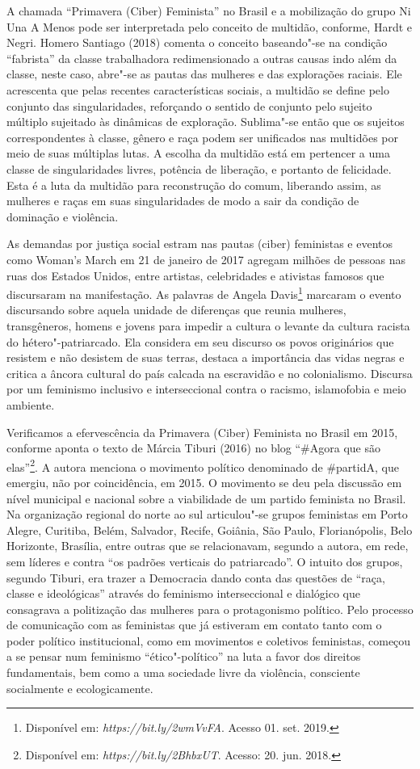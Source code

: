 A chamada ``Primavera (Ciber) Feminista'' no Brasil e a mobilização do
grupo Ni Una A Menos pode ser interpretada pelo conceito de multidão,
conforme, Hardt e Negri. Homero Santiago (2018) comenta o conceito
baseando"-se na condição ``fabrista'' da classe trabalhadora
redimensionado a outras causas indo além da classe, neste caso, abre"-se
as pautas das mulheres e das explorações raciais. Ele acrescenta que
pelas recentes características sociais, a multidão se define pelo
conjunto das singularidades, reforçando o sentido de conjunto pelo
sujeito múltiplo sujeitado às dinâmicas de exploração. Sublima"-se então
que os sujeitos correspondentes à classe, gênero e raça podem ser
unificados nas multidões por meio de suas múltiplas lutas. A escolha da
multidão está em pertencer a uma classe de singularidades livres,
potência de liberação, e portanto de felicidade. Esta é a luta da
multidão para reconstrução do comum, liberando assim, as mulheres e
raças em suas singularidades de modo a sair da condição de dominação e
violência.

As demandas por justiça social estram nas pautas (ciber) feministas e
eventos como Woman's March em 21 de janeiro de 2017 agregam milhões de
pessoas nas ruas dos Estados Unidos, entre artistas, celebridades e
ativistas famosos que discursaram na manifestação. As palavras de Angela
Davis\footnote{Disponível em:
  \emph{https://bit.ly/2wmVvFA}.
  Acesso 01. set. 2019.} marcaram o evento discursando sobre aquela
unidade de diferenças que reunia mulheres, transgêneros, homens e jovens
para impedir a cultura o levante da cultura racista do
hétero"-patriarcado. Ela considera em seu discurso os povos originários
que resistem e não desistem de suas terras, destaca a importância das
vidas negras e critica a âncora cultural do país calcada na escravidão e
no colonialismo. Discursa por um feminismo inclusivo e interseccional
contra o racismo, islamofobia e meio ambiente.

Verificamos a efervescência da Primavera (Ciber) Feminista no Brasil em
2015, conforme aponta o texto de Márcia Tiburi (2016) no blog ``\#Agora
que são elas''\footnote{Disponível em:
  \emph{https://bit.ly/2BhbxUT}.
  Acesso: 20. jun. 2018.}. A autora menciona o movimento político
denominado de \#partidA, que emergiu, não por coincidência, em 2015. O
movimento se deu pela discussão em nível municipal e nacional sobre a
viabilidade de um partido feminista no Brasil. Na organização regional
do norte ao sul articulou"-se grupos feministas em Porto Alegre,
Curitiba, Belém, Salvador, Recife, Goiânia, São Paulo, Florianópolis,
Belo Horizonte, Brasília, entre outras que se relacionavam, segundo a
autora, em rede, sem líderes e contra ``os padrões verticais do
patriarcado''. O intuito dos grupos, segundo Tiburi, era trazer a
Democracia dando conta das questões de ``raça, classe e ideológicas''
através do feminismo interseccional e dialógico que consagrava a
politização das mulheres para o protagonismo político. Pelo processo de
comunicação com as feministas que já estiveram em contato tanto com o
poder político institucional, como em movimentos e coletivos feministas,
começou a se pensar num feminismo ``ético"-político'' na luta a favor dos
direitos fundamentais, bem como a uma sociedade livre da violência,
consciente socialmente e ecologicamente.

